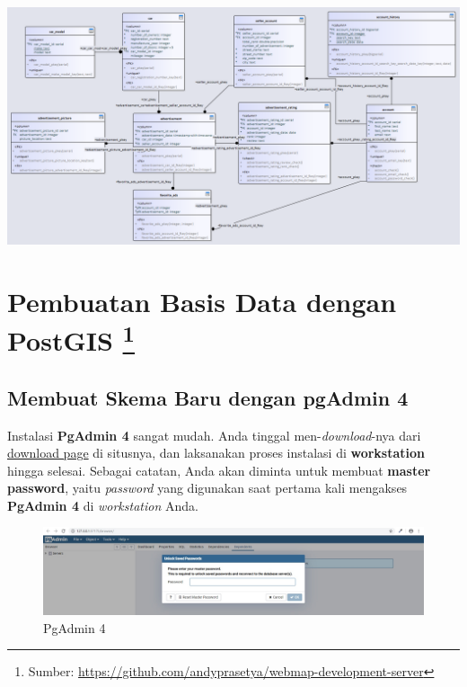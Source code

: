 \documentclass[]{book}
\let\rmarkdownfootnote\footnote%
\def\footnote{\protect\rmarkdownfootnote}
\begin{document}
\begin{center}\includegraphics[width=0.9\linewidth]{img/01/db_model4} \end{center}

\hypertarget{pembuatan-basis-data-dengan-postgis}{%
\section[Pembuatan Basis Data dengan PostGIS ]{\texorpdfstring{Pembuatan Basis Data dengan PostGIS \footnote{Sumber: \url{https://github.com/andyprasetya/webmap-development-server}}}{Pembuatan Basis Data dengan PostGIS }}\label{pembuatan-basis-data-dengan-postgis}}

\hypertarget{membuat-skema-baru-dengan-pgadmin-4}{%
\subsection{Membuat Skema Baru dengan pgAdmin 4}\label{membuat-skema-baru-dengan-pgadmin-4}}

Instalasi \textbf{PgAdmin 4} sangat mudah. Anda tinggal men-\emph{download}-nya dari \href{https://www.pgadmin.org/download/}{download page} di situsnya, dan laksanakan proses instalasi di \textbf{workstation} hingga selesai. Sebagai catatan, Anda akan diminta untuk membuat \textbf{master password}, yaitu \emph{password} yang digunakan saat pertama kali mengakses \textbf{PgAdmin 4} di \emph{workstation} Anda.

\begin{figure}
\centering
\includegraphics{./img/pgadmin4-master-password.jpg}
\caption{PgAdmin 4}
\end{figure}
\end{document}

